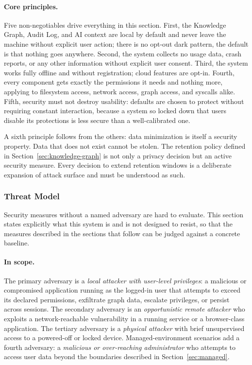 \paragraph{Core principles.}
Five non-negotiables drive everything in this section. First, the Knowledge
Graph, Audit Log, and AI context are local by default and never leave the
machine without explicit user action; there is no opt-out dark pattern, the
default is that nothing goes anywhere. Second, the system collects no usage
data, crash reports, or any other information without explicit user consent.
Third, the system works fully offline and without registration; cloud features
are opt-in. Fourth, every component gets exactly the permissions it needs and
nothing more, applying to filesystem access, network access, graph access, and
syscalls alike. Fifth, security must not destroy usability: defaults are
chosen to protect without requiring constant interaction, because a system so
locked down that users disable its protections is less secure than a
well-calibrated one.

A sixth principle follows from the others: data minimization is itself a
security property. Data that does not exist cannot be stolen. The retention
policy defined in Section~\ref{sec:knowledge-graph} is not only a privacy
decision but an active security measure. Every decision to extend retention
windows is a deliberate expansion of attack surface and must be understood
as such.

\subsubsection{Threat Model}
\label{sec:threat-model}

Security measures without a named adversary are hard to evaluate. This section
states explicitly what this system is and is not designed to resist, so that
the measures described in the sections that follow can be judged against a
concrete baseline.

\paragraph{In scope.}
The primary adversary is a \emph{local attacker with user-level privileges}: a
malicious or compromised application running as the logged-in user that attempts
to exceed its declared permissions, exfiltrate graph data, escalate privileges,
or persist across sessions. The secondary adversary is an \emph{opportunistic
remote attacker} who exploits a network-reachable vulnerability in a running
service or a browser-class application. The tertiary adversary is a
\emph{physical attacker} with brief unsupervised access to a powered-off or
locked device. Managed-environment scenarios add a fourth adversary: a
\emph{malicious or over-reaching administrator} who attempts to access user
data beyond the boundaries described in Section~\ref{sec:managed}.


